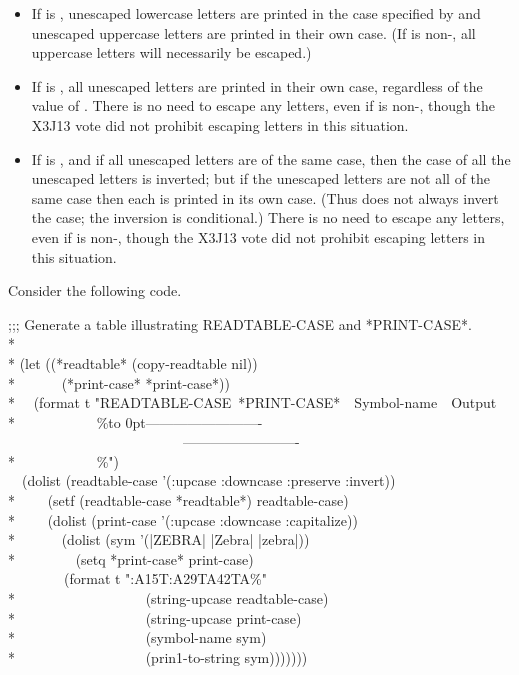 \begin{defun}[Variable]
\begin{newer}
\begin{itemize}
\item If  is , unescaped lowercase letters are printed
    in the case specified by  and unescaped uppercase letters
    are printed in their own case.  (If  is non-{\false},
    all uppercase letters will necessarily be escaped.)

\item  If  is ,
    all unescaped letters are printed in their own case,
    regardless of the value of .  There is no
    need to escape any letters, even if  is non-{\false},
    though the X3J13 vote did not prohibit escaping letters in this situation.

\item If  is ,
    and if all unescaped letters are of the same
    case, then the case of all the unescaped letters is inverted; but if the unescaped
    letters are not all of the same case then each is printed in its own case.
    (Thus  does not always invert the case; the inversion is conditional.)
    There is no
    need to escape any letters, even if  is non-{\false},
    though the X3J13 vote did not prohibit escaping letters in this situation.
\end{itemize}
Consider the following code.
\begin{lisp}
;;; Generate a table illustrating READTABLE-CASE and *PRINT-CASE*. \\*
\\*
(let ((*readtable* (copy-readtable nil)) \\*
~~~~~~(*print-case* *print-case*)) \\*
~~(format t "READTABLE-CASE~*PRINT-CASE*~~Symbol-name~~Output{\Xtilde} \\*
~~~~~~~~~~~{\Xtilde}\%\hbox to 0pt{-------------------------\hss}~~~~~~~~~~~~~~~~~~~~~~~~~-------------------------{\Xtilde} \\*
~~~~~~~~~~~{\Xtilde}\%") \\
~~(dolist (readtable-case '(:upcase :downcase :preserve :invert)) \\*
~~~~(setf (readtable-case *readtable*) readtable-case) \\*
~~~~(dolist (print-case '(:upcase :downcase :capitalize)) \\*
~~~~~~(dolist (sym '(|ZEBRA| |Zebra| |zebra|)) \\*
~~~~~~~~(setq *print-case* print-case) \\
~~~~~~~~(format t ":{\Xtilde}A{\Xtilde}15T:{\Xtilde}A{\Xtilde}29T{\Xtilde}A{\Xtilde}42T{\Xtilde}A{\Xtilde}\%" \\*
~~~~~~~~~~~~~~~~~~(string-upcase readtable-case) \\*
~~~~~~~~~~~~~~~~~~(string-upcase print-case) \\*
~~~~~~~~~~~~~~~~~~(symbol-name sym) \\*
~~~~~~~~~~~~~~~~~~(prin1-to-string sym)))))))
\end{lisp}


\end{newer}
\end{defun}
